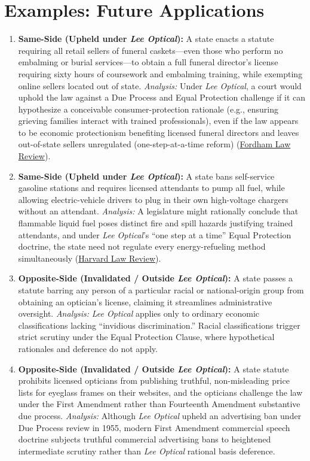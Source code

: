 \documentclass[12pt]{article}
\begin{document}
\section{Examples: Future Applications}
\begin{enumerate}
    \item \textbf{Same-Side (Upheld under \textit{Lee Optical}):} A state enacts a statute requiring all retail sellers of funeral caskets---even those who perform no embalming or burial services---to obtain a full funeral director's license requiring sixty hours of coursework and embalming training, while exempting online sellers located out of state. \textit{Analysis:} Under \textit{Lee Optical}, a court would uphold the law against a Due Process and Equal Protection challenge if it can hypothesize a conceivable consumer-protection rationale (e.g., ensuring grieving families interact with trained professionals), even if the law appears to be economic protectionism benefiting licensed funeral directors and leaves out-of-state sellers unregulated (one-step-at-a-time reform) (\href{https://ir.lawnet.fordham.edu/cgi/viewcontent.cgi?article=4853&context=flr}{Fordham Law Review}).
    \item \textbf{Same-Side (Upheld under \textit{Lee Optical}):} A state bans self-service gasoline stations and requires licensed attendants to pump all fuel, while allowing electric-vehicle drivers to plug in their own high-voltage chargers without an attendant. \textit{Analysis:} A legislature might rationally conclude that flammable liquid fuel poses distinct fire and spill hazards justifying trained attendants, and under \textit{Lee Optical}'s ``one step at a time'' Equal Protection doctrine, the state need not regulate every energy-refueling method simultaneously (\href{https://harvardlawreview.org/print/vol-138/when-rational-basis-review-bit/}{Harvard Law Review}).
    \item \textbf{Opposite-Side (Invalidated / Outside \textit{Lee Optical}):} A state passes a statute barring any person of a particular racial or national-origin group from obtaining an optician's license, claiming it streamlines administrative oversight. \textit{Analysis:} \textit{Lee Optical} applies only to ordinary economic classifications lacking ``invidious discrimination.'' Racial classifications trigger strict scrutiny under the Equal Protection Clause, where hypothetical rationales and deference do not apply.
    \item \textbf{Opposite-Side (Invalidated / Outside \textit{Lee Optical}):} A state statute prohibits licensed opticians from publishing truthful, non-misleading price lists for eyeglass frames on their websites, and the opticians challenge the law under the First Amendment rather than Fourteenth Amendment substantive due process. \textit{Analysis:} Although \textit{Lee Optical} upheld an advertising ban under Due Process review in 1955, modern First Amendment commercial speech doctrine subjects truthful commercial advertising bans to heightened intermediate scrutiny rather than \textit{Lee Optical} rational basis deference.

\end{enumerate}
\end{document}
